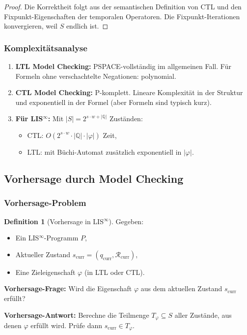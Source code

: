 \documentclass[a4paper,12pt]{article}
\theoremstyle{definition}
\newtheorem{definition}{Definition}
\begin{document}
	\begin{proof}
		Die Korrektheit folgt aus der semantischen Definition von CTL und den Fixpunkt-Eigenschaften der temporalen Operatoren. Die Fixpunkt-Iterationen konvergieren, weil $S$ endlich ist.
	\end{proof}
	
	\subsubsection{Komplexitätsanalyse}
	
	\begin{theorem}
		\label{thm:complexity_model_checking}
		\begin{enumerate}
			\item \textbf{LTL Model Checking:} PSPACE-vollständig im allgemeinen Fall. Für Formeln ohne verschachtelte Negationen: polynomial.
			\item \textbf{CTL Model Checking:} P-komplett. Lineare Komplexität in der Struktur und exponentiell in der Formel (aber Formeln sind typisch kurz).
			\item \textbf{Für LIS$^{\infty}$:} Mit $|S| = 2^{s \cdot w + |\mathbb{Q}|}$ Zuständen:
			\begin{itemize}
				\item CTL: $O(2^{s \cdot w} \cdot |\mathbb{Q}| \cdot |\varphi|)$ Zeit,
				\item LTL: mit Büchi-Automat zusätzlich exponentiell in $|\varphi|$.
			\end{itemize}
		\end{enumerate}
	\end{theorem}
	
	\subsection{Vorhersage durch Model Checking}
	
	\subsubsection{Vorhersage-Problem}
	
	\begin{definition}[Vorhersage in LIS$^{\infty}$]
		\label{def:vorhersage}
		Gegeben:
		\begin{itemize}
			\item Ein LIS$^{\infty}$-Programm $P$,
			\item Aktueller Zustand $s_{\text{curr}} = (q_{\text{curr}}, \mathcal{R}_{\text{curr}})$,
			\item Eine Zieleigenschaft $\varphi$ (in LTL oder CTL).
		\end{itemize}
		
		\textbf{Vorhersage-Frage:} Wird die Eigenschaft $\varphi$ aus dem aktuellen Zustand $s_{\text{curr}}$ erfüllt?
		
		\textbf{Vorhersage-Antwort:} Berechne die Teilmenge $T_{\varphi} \subseteq S$ aller Zustände, aus denen $\varphi$ erfüllt wird. Prüfe dann $s_{\text{curr}} \in T_{\varphi}$.
	\end{definition}
	
\end{document}
